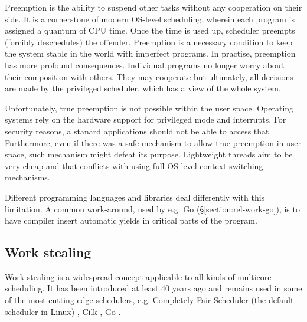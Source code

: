 \documentclass[12pt,a4paper,twoside]{report}
\begin{document}
Preemption is the ability to suspend other tasks without any cooperation on their side. It is a cornerstone of modern OS-level scheduling, wherein each program is assigned a quantum of CPU time. Once the time is used up, scheduler preempts (forcibly deschedules) the offender. Preemption is a necessary condition to keep the system stable in the world with imperfect programs. In practise, preemption has more profound consequences. Individual programs no longer worry about their composition with others. They may cooperate but ultimately, all decisions are made by the privileged scheduler, which has a view of the whole system.

Unfortunately, true preemption is not possible within the user space. Operating systems rely on the hardware support for privileged mode and interrupts. For security reasons, a stanard applications should not be able to access that. Furthermore, even if there was a safe mechanism to allow true preemption in user space, such mechanism might defeat its purpose. Lightweight threads aim to be very cheap and that conflicts with using full OS-level context-switching mechanisms.

Different programming languages and libraries deal differently with this limitation. A common work-around, used by e.g. Go (\S\ref{section:rel-work-go}), is to have compiler insert automatic yields in critical parts of the program.

\subsection{Work stealing}
\label{section:background-work-stealing}
Work-stealing is a widespread concept applicable to all kinds of multicore scheduling. It has been introduced at least 40 years ago \cite{Blumofe1999} and remains used in some of the most cutting edge schedulers, e.g. Completely Fair Scheduler (the default scheduler in Linux) \cite{linux_cfs}, Cilk \cite{Blumofe1995}, Go \cite{golang}.
\end{document}
